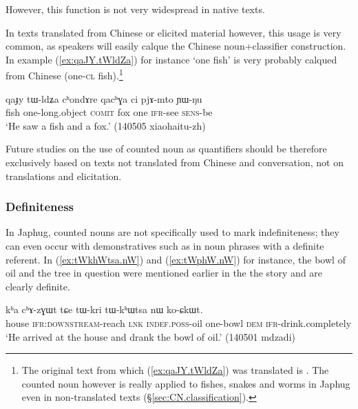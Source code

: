 However, this function is not very widespread in native texts.

In texts translated from Chinese or elicited material however, this usage is very common, as speakers will easily calque the Chinese noun+classifier construction. In example (\ref{ex:qaJY.tWldZa}) for instance  `one fish' is very probably calqued from Chinese   (one-\textsc{cl} fish).\footnote{The original text from which (\ref{ex:qaJY.tWldZa}) was translated is . The counted noun  however is really applied to fishes, snakes and worms in Japhug even in non-translated texts (§\ref{sec:CN.classification}).  } 

\begin{exe}
	\ex \label{ex:qaJY.tWldZa}
	\gll qaɟy tɯ-ldʑa cʰondɤre qacʰɣa ci pjɤ-mto ɲɯ-ŋu \\
	fish one-long.object \textsc{comit} fox one \textsc{ifr}-see \textsc{sens}-be \\
	\glt `He saw a fish and a fox.' (140505 xiaohaitu-zh)
\end{exe} 

Future studies on the use of counted noun as quantifiers should be therefore exclusively based on texts not translated from Chinese and conversation, not on translations and elicitation.


\subsubsection{Definiteness} \label{sec:CN.definiteness}
In Japhug, counted nouns are not specifically used to mark indefiniteness; they can even occur with demonstratives such as  in noun phrases with a definite referent. In  (\ref{ex:tWkhWtsa.nW}) and (\ref{ex:tWphW.nW}) for instance, the bowl of oil and the tree in question were mentioned earlier in the  the story and are clearly definite.

\begin{exe}
	\ex \label{ex:tWkhWtsa.nW}
	\gll kʰa cʰɤ-zɣɯt tɕe tɯ-kri tɯ-kʰɯtsa nɯ ko-ɕkɯt.  \\
	house \textsc{ifr}:\textsc{downstream}-reach \textsc{lnk} \textsc{indef}.\textsc{poss}-oil one-bowl \textsc{dem} \textsc{ifr}-drink.completely \\
	\glt `He arrived at the house and drank the bowl of oil.' (140501 mdzadi)
\end{exe}

